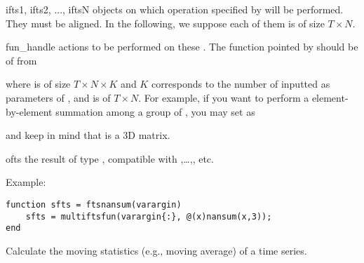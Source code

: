 \inarg
   \begin{argdesc}
   \item[ifts1, ifts2, ..., iftsN] \myfints{} objects on which operation specified by
         will be performed.
        They must be aligned.
        In the following, we suppose each of them is of size $T\times N$.
   \item[fun\_handle] actions to be performed on these \myfints{}.
        The function pointed by  should be of from\par
        \hspace{1.0cm}\par
        where  is of size $T\times N\times K$ and $K$ 
        corresponds to the number of \myfints{} inputted as parameters of
        , 
        and  is of $T\times N$.
        For example, if you want to perform a element-by-element summation among
        a group of \myfints{}, you may set  as \par
        \hspace{1.0cm}\par
        and keep in mind that  is a 3D matrix. 
   \end{argdesc}
\outarg
   \begin{argdesc}
   \item[ofts] the result of type \myfints{}, compatible with ,\ldots,, etc. 
   \end{argdesc}

\noindent Example:
\begin{lstlisting}
function sfts = ftsnansum(varargin)
    sfts = multiftsfun(varargin{:}, @(x)nansum(x,3));
end
\end{lstlisting}

   Calculate the moving statistics (e.g., moving average) of a time series.

